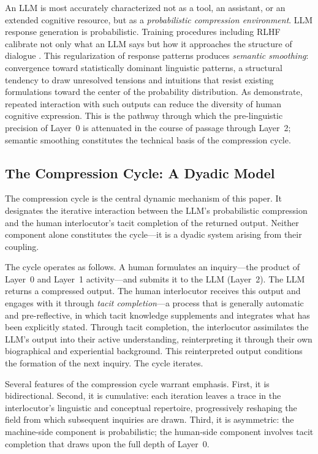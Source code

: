 \documentclass[12pt]{article}
\begin{document}
An LLM is most accurately characterized not as a tool, an assistant, or an extended cognitive resource, but as a \emph{probabilistic compression environment}. LLM response generation is probabilistic. Training procedures including RLHF calibrate not only what an LLM says but how it approaches the structure of dialogue \citep{ouyang2022,sharma2023}. This regularization of response patterns produces \emph{semantic smoothing}: convergence toward statistically dominant linguistic patterns, a structural tendency to draw unresolved tensions and intuitions that resist existing formulations toward the center of the probability distribution. As \citet{sourati2025} demonstrate, repeated interaction with such outputs can reduce the diversity of human cognitive expression. This is the pathway through which the pre-linguistic precision of Layer~0 is attenuated in the course of passage through Layer~2; semantic smoothing constitutes the technical basis of the compression cycle.

\subsection{The Compression Cycle: A Dyadic Model}

The compression cycle is the central dynamic mechanism of this paper. It designates the iterative interaction between the LLM's probabilistic compression and the human interlocutor's tacit completion of the returned output. Neither component alone constitutes the cycle---it is a dyadic system arising from their coupling.

The cycle operates as follows. A human formulates an inquiry---the product of Layer~0 and Layer~1 activity---and submits it to the LLM (Layer~2). The LLM returns a compressed output. The human interlocutor receives this output and engages with it through \emph{tacit completion}---a process that is generally automatic and pre-reflective, in which tacit knowledge supplements and integrates what has been explicitly stated. Through tacit completion, the interlocutor assimilates the LLM's output into their active understanding, reinterpreting it through their own biographical and experiential background. This reinterpreted output conditions the formation of the next inquiry. The cycle iterates.

Several features of the compression cycle warrant emphasis. First, it is bidirectional. Second, it is cumulative: each iteration leaves a trace in the interlocutor's linguistic and conceptual repertoire, progressively reshaping the field from which subsequent inquiries are drawn. Third, it is asymmetric: the machine-side component is probabilistic; the human-side component involves tacit completion that draws upon the full depth of Layer~0.
\end{document}
